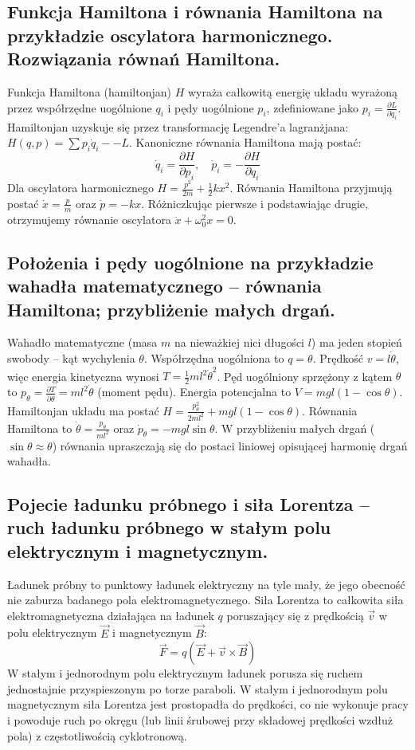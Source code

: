 \documentclass[11pt,a4paper]{article}
\begin{document}
\subsection{Funkcja Hamiltona i równania Hamiltona na przykładzie oscylatora harmonicznego. Rozwiązania równań Hamiltona.}
Funkcja Hamiltona (hamiltonjan) $H$ wyraża całkowitą energię układu wyrażoną przez współrzędne uogólnione $q_i$ i pędy uogólnione $p_i$, zdefiniowane jako $p_i = \frac{\partial L}{\partial \dot{q}_i}$. Hamiltonjan uzyskuje się przez transformację Legendre’a lagranżjana: $H(q, p) = \sum p_i \dot{q}_i -- L$. Kanoniczne równania Hamiltona mają postać:
\begin{equation}
\dot{q}_i = \frac{\partial H}{\partial p_i}, \quad \dot{p}_i = -\frac{\partial H}{\partial q_i}
\end{equation}
Dla oscylatora harmonicznego $H = \frac{p^2}{2m} + \frac{1}{2}kx^2$. Równania Hamiltona przyjmują postać $\dot{x} = \frac{p}{m}$ oraz $\dot{p} = -kx$. Różniczkując pierwsze i podstawiając drugie, otrzymujemy równanie oscylatora $\ddot{x} + \omega_0^2 x = 0$.

\subsection{Położenia i pędy uogólnione na przykładzie wahadła matematycznego -- równania Hamiltona; przybliżenie małych drgań.}
Wahadło matematyczne (masa $m$ na nieważkiej nici długości $l$) ma jeden stopień swobody -- kąt wychylenia $\theta$. Współrzędna uogólniona to $q = \theta$. Prędkość $v = l\dot{\theta}$, więc energia kinetyczna wynosi $T = \frac{1}{2}ml^2\dot{\theta}^2$. Pęd uogólniony sprzężony z kątem $\theta$ to $p_\theta = \frac{\partial T}{\partial \dot{\theta}} = ml^2\dot{\theta}$ (moment pędu). Energia potencjalna to $V = mgl(1 - \cos\theta)$. Hamiltonjan układu ma postać $H = \frac{p_\theta^2}{2ml^2} + mgl(1 - \cos\theta)$. Równania Hamiltona to $\dot{\theta} = \frac{p_\theta}{ml^2}$ oraz $\dot{p}_\theta = -mgl\sin\theta$. W przybliżeniu małych drgań ($\sin\theta \approx \theta$) równania upraszczają się do postaci liniowej opisującej harmonię drgań wahadła.

\subsection{Pojecie ładunku próbnego i siła Lorentza -- ruch ładunku próbnego w stałym polu elektrycznym i magnetycznym.}
Ładunek próbny to punktowy ładunek elektryczny na tyle mały, że jego obecność nie zaburza badanego pola elektromagnetycznego. Siła Lorentza to całkowita siła elektromagnetyczna działająca na ładunek $q$ poruszający się z prędkością $\vec{v}$ w polu elektrycznym $\vec{E}$ i magnetycznym $\vec{B}$:
\begin{equation}
\vec{F} = q(\vec{E} + \vec{v} \times \vec{B})
\end{equation}
W stałym i jednorodnym polu elektrycznym ładunek porusza się ruchem jednostajnie przyspieszonym po torze paraboli. W stałym i jednorodnym polu magnetycznym siła Lorentza jest prostopadła do prędkości, co nie wykonuje pracy i powoduje ruch po okręgu (lub linii śrubowej przy składowej prędkości wzdłuż pola) z częstotliwością cyklotronową.
\end{document}
